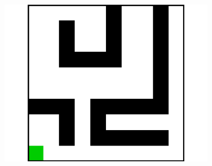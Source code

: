 \documentclass{article}
\begin{document}
\begin{figure}[t]
\begin{subfigure}[t]{0.18\textwidth}
    \includegraphics[width=\textwidth]{images/maze/maze14.pdf}
    \caption{}
  \end{subfigure}
  

\end{figure}
\end{document}
